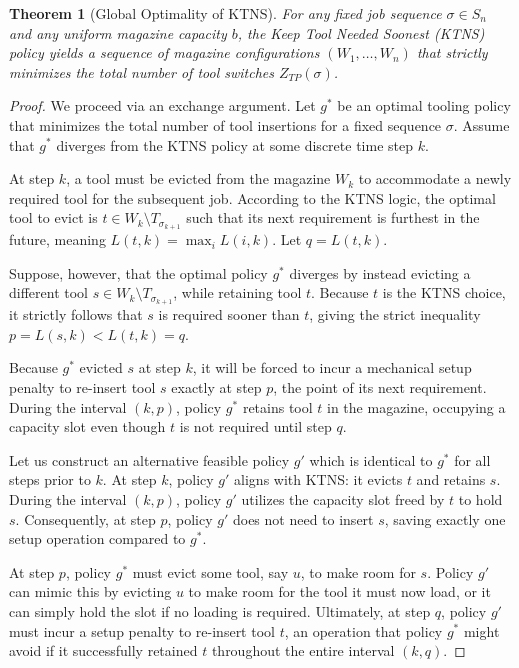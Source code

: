 \documentclass[11pt, a4paper]{book}
\newtheorem{theorem}{Theorem}[chapter]
\begin{document}
	\begin{theorem}[Global Optimality of KTNS]
		For any fixed job sequence $\sigma \in S_n$ and any uniform magazine capacity $b$, the Keep Tool Needed Soonest (KTNS) policy yields a sequence of magazine configurations $(W_1, \dots, W_n)$ that strictly minimizes the total number of tool switches $Z_{TP}(\sigma)$.
	\end{theorem}
	
	\begin{proof}
		We proceed via an exchange argument. Let $g^*$ be an optimal tooling policy that minimizes the total number of tool insertions for a fixed sequence $\sigma$. Assume that $g^*$ diverges from the KTNS policy at some discrete time step $k$.
		
		At step $k$, a tool must be evicted from the magazine $W_k$ to accommodate a newly required tool for the subsequent job. According to the KTNS logic, the optimal tool to evict is $t \in W_k \setminus T_{\sigma_{k+1}}$ such that its next requirement is furthest in the future, meaning $L(t, k) = \max_{i} L(i, k)$. Let $q = L(t, k)$.
		
		Suppose, however, that the optimal policy $g^*$ diverges by instead evicting a different tool $s \in W_k \setminus T_{\sigma_{k+1}}$, while retaining tool $t$. Because $t$ is the KTNS choice, it strictly follows that $s$ is required sooner than $t$, giving the strict inequality $p = L(s, k) < L(t, k) = q$.
		
		Because $g^*$ evicted $s$ at step $k$, it will be forced to incur a mechanical setup penalty to re-insert tool $s$ exactly at step $p$, the point of its next requirement. During the interval $(k, p)$, policy $g^*$ retains tool $t$ in the magazine, occupying a capacity slot even though $t$ is not required until step $q$.
		
		Let us construct an alternative feasible policy $g'$ which is identical to $g^*$ for all steps prior to $k$. At step $k$, policy $g'$ aligns with KTNS: it evicts $t$ and retains $s$. During the interval $(k, p)$, policy $g'$ utilizes the capacity slot freed by $t$ to hold $s$. Consequently, at step $p$, policy $g'$ does not need to insert $s$, saving exactly one setup operation compared to $g^*$.
		
		At step $p$, policy $g^*$ must evict some tool, say $u$, to make room for $s$. Policy $g'$ can mimic this by evicting $u$ to make room for the tool it must now load, or it can simply hold the slot if no loading is required. Ultimately, at step $q$, policy $g'$ must incur a setup penalty to re-insert tool $t$, an operation that policy $g^*$ might avoid if it successfully retained $t$ throughout the entire interval $(k, q)$.
		

\end{proof}
\end{document}

